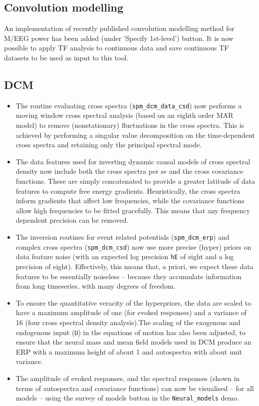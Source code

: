 \documentclass[a4paper,titlepage,openany]{article}
\begin{document}
\begin{multicols}{2}
\subsection{Convolution modelling}

An implementation of recently published convolution modelling method for M/EEG power \cite{Litvak_ConvModel_2013} has been added (under 'Specify 1st-level') button. It is now possible to apply TF analysis to continuous data and save continuous TF datasets to be used as input to this tool.

\subsection{DCM}

\begin{itemize}
\item The routine evaluating cross spectra (\texttt{spm\_dcm\_data\_csd}) now performs a moving window cross spectral analysis (based on an eighth order MAR model) to remove (nonstationary) fluctuations in the cross spectra. This is achieved by performing a singular value decomposition on the time-dependent cross spectra and retaining only the principal spectral mode.
\item The data features used for inverting dynamic causal models of cross spectral density now include both the cross spectra per se and the cross covariance functions. These are simply concatenated to provide a greater latitude of data features to compute free energy gradients. Heuristically, the cross spectra inform gradients that affect low frequencies, while the covariance functions allow high frequencies to be fitted gracefully. This means that any frequency dependent precision can be removed.
\item The inversion routines for event related potentials (\texttt{spm\_dcm\_erp}) and complex cross spectra (\texttt{spm\_dcm\_csd}) now use more precise (hyper) priors on data feature noise (with an expected log precision \texttt{hE} of eight and a log precision of eight). Effectively, this means that, a priori, we expect these data features to be essentially noiseless -- because they accumulate information from long timeseries, with many degrees of freedom.
\item To ensure the quantitative veracity of the hyperpriors, the data are scaled to have a maximum amplitude of one (for evoked responses) and a variance of 16 (four cross spectral density analysis).The scaling of the exogenous and endogenous input (\texttt{U}) in the equations of motion has also been adjusted, to ensure that the neural mass and mean field models used in DCM produce an ERP with a maximum height of about 1 and autospectra with about unit variance.
\item The amplitude of evoked responses, and the spectral responses (shown in terms of autospectra and covariance functions) can now be visualised -- for all models -- using the survey of models button in the \texttt{Neural\_models} demo.
\end{itemize}


\end{multicols}
\end{document}
